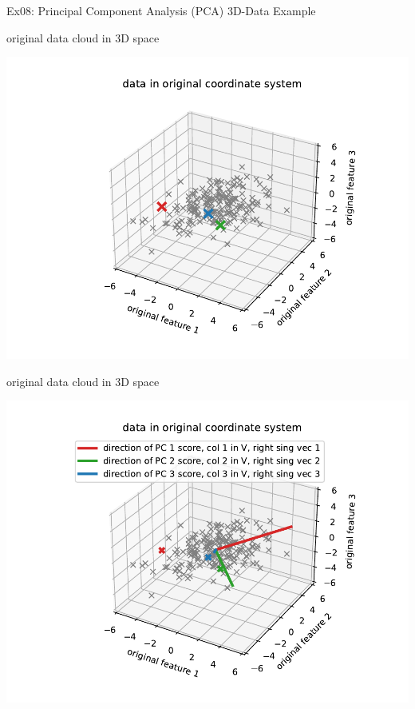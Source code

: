 \documentclass[mathserif, aspectratio=1610]{intbeamer}
\begin{document}
\begin{frame}[t]{Ex08: Principal Component Analysis (PCA) 3D-Data Example}
\begin{minipage}[t]{0.49\textwidth}
original data cloud in 3D space

\includegraphics[width=\textwidth]{pca_3d_original_data.pdf}
\end{minipage}
%
\begin{minipage}[t]{0.49\textwidth}
original data cloud in 3D space

\includegraphics[width=\textwidth]{pca_3d_original_data_with_pcdir.pdf}
\end{minipage}
\end{frame}
\end{document}
